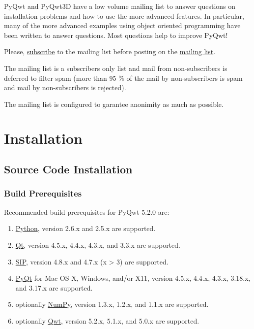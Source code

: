 \documentclass[a4paper,10pt,english]{manual}
\begin{document}
PyQwt and PyQwt3D have a low volume mailing list to answer questions
on installation problems and how to use the more advanced features.
In particular, many of the more advanced examples using object
oriented programming have been written to answer questions.
Most questions help to improve PyQwt!

Please,
\href{http://lists.sourceforge.net/lists/listinfo/pyqwt-users}{subscribe}
to the mailing list before posting on the
\href{mailto:pyqwt-users@lists.sourceforge.net}{mailing list}.

The mailing list is a subscribers only list and mail from
non-subscribers is deferred to filter spam (more than 95 \% of the mail
by non-subscribers is spam and mail by non-subscribers is rejected).

The mailing list is configured to garantee anonimity as much as
possible.

\resetcurrentobjects
\hypertarget{--doc-installation}{}

\chapter{Installation}


\section{Source Code Installation}


\subsection{Build Prerequisites}

Recommended build prerequisites for PyQwt-5.2.0 are:
\begin{enumerate}
\item {} 
\href{http://www.python.org}{Python}, version 2.6.x and 2.5.x are
supported.

\item {} 
\href{http://trolltech.com/products/qt}{Qt}, version 4.5.x, 4.4.x,
4.3.x, and 3.3.x  are supported.

\item {} 
\href{http://www.riverbankcomputing.co.uk/software/sip/intro}{SIP},
version 4.8.x and 4.7.x (x \textgreater{} 3) are supported.

\item {} 
\href{http://www.riverbankcomputing.co.uk/software/pyqt/intro}{PyQt}
for Mac OS X, Windows, and/or X11, version 4.5.x, 4.4.x, 4.3.x,
3.18.x, and 3.17.x are supported.

\item {} 
optionally \href{http://www.scipy.org/NumPy}{NumPy}, version 1.3.x,
1.2.x, and 1.1.x are supported.

\item {} 
optionally \href{http://qwt.sourceforge.net}{Qwt}, version 5.2.x,
5.1.x, and 5.0.x are supported.

\end{enumerate}
\end{document}
